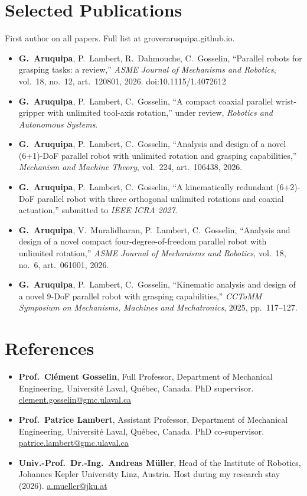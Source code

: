 \documentclass[10pt,letterpaper]{article}
\begin{document}
\section{Selected Publications}
{\small First author on all papers. Full list at groveraruquipa.github.io.}\par\vspace{2pt}
\begin{itemize}
\item \textbf{G.~Aruquipa}, P.~Lambert, R.~Dahmouche, C.~Gosselin, ``Parallel robots for grasping tasks: a review,'' \emph{ASME Journal of Mechanisms and Robotics}, vol.~18, no.~12, art.~120801, 2026. doi:10.1115/1.4072612
\item \textbf{G.~Aruquipa}, P.~Lambert, C.~Gosselin, ``A compact coaxial parallel wrist-gripper with unlimited tool-axis rotation,'' under review, \emph{Robotics and Autonomous Systems}.
\item \textbf{G.~Aruquipa}, P.~Lambert, C.~Gosselin, ``Analysis and design of a novel (6+1)-DoF parallel robot with unlimited rotation and grasping capabilities,'' \emph{Mechanism and Machine Theory}, vol.~224, art.~106438, 2026.
\item \textbf{G.~Aruquipa}, P.~Lambert, C.~Gosselin, ``A kinematically redundant (6+2)-DoF parallel robot with three orthogonal unlimited rotations and coaxial actuation,'' submitted to \emph{IEEE ICRA 2027}.
\item \textbf{G.~Aruquipa}, V.~Muralidharan, P.~Lambert, C.~Gosselin, ``Analysis and design of a novel compact four-degree-of-freedom parallel robot with unlimited rotation,'' \emph{ASME Journal of Mechanisms and Robotics}, vol.~18, no.~6, art.~061001, 2026.
\item \textbf{G.~Aruquipa}, P.~Lambert, C.~Gosselin, ``Kinematic analysis and design of a novel 9-DoF parallel robot with grasping capabilities,'' \emph{CCToMM Symposium on Mechanisms, Machines and Mechatronics}, 2025, pp.~117--127.
\end{itemize}

\section{References}
\begin{itemize}
\item \textbf{Prof.~Cl\'ement Gosselin}, Full Professor, Department of Mechanical Engineering, Universit\'e Laval, Qu\'ebec,
Canada. PhD supervisor. \href{mailto:clement.gosselin@gmc.ulaval.ca}{clement.gosselin@gmc.ulaval.ca}
\item \textbf{Prof.~Patrice Lambert}, Assistant Professor, Department of Mechanical Engineering, Universit\'e Laval,
Qu\'ebec, Canada. PhD co-supervisor. \href{mailto:patrice.lambert@gmc.ulaval.ca}{patrice.lambert@gmc.ulaval.ca}
\item \textbf{Univ.-Prof.~Dr.-Ing.~Andreas M\"uller}, Head of the Institute of Robotics, Johannes Kepler University Linz,
Austria. Host during my research stay (2026). \href{mailto:a.mueller@jku.at}{a.mueller@jku.at}
\end{itemize}
\end{document}
